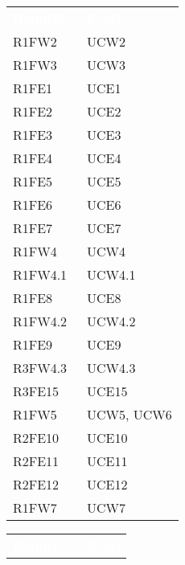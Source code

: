 \begin{table}[!htbp]
\renewcommand{\arraystretch}{1.5}
\begin{tabular}{ m{}<{\centering}  m{}<{\centering} }
	\rowcolor{darkblue}
	\textcolor{white}{\textbf{Requisito}} &\textcolor{white}{\textbf{Fonti}}\\ 	
	 
	R1FW2 & UCW2\\	

	R1FW3 & UCW3\\	
	 
	R1FE1 & UCE1\\	
	 
 	R1FE2 & UCE2\\	
	 
	R1FE3 & UCE3\\	

	R1FE4 & UCE4\\	
	
	R1FE5 & UCE5 \\
	 
	R1FE6 & UCE6 \\	 
	 
	R1FE7 & UCE7\\	

	R1FW4 & UCW4 \\ 
	 
	R1FW4.1 & UCW4.1\\	
	 
	R1FE8 & UCE8\\	
	 
	R1FW4.2 & UCW4.2\\		 

	R1FE9 & UCE9 \\		
	 
	R3FW4.3 & UCW4.3\\				
	 
	R3FE15 & UCE15\\			
	  	 	 	
	R1FW5 & UCW5, UCW6\\		
	 
	R2FE10 & UCE10\\
	
	R2FE11 & UCE11\\
	 
	R2FE12 & UCE12\\	
	
	R1FW7 & UCW7\\

\end{tabular}
\begin{tabular}{ m{}<{\centering}  m{}<{\centering} }
	\rowcolor{darkblue}
	\textcolor{white}{\textbf{Requisito}} &\textcolor{white}{\textbf{Fonti}}\\ 			 
	 

\end{tabular}
\end{table}

